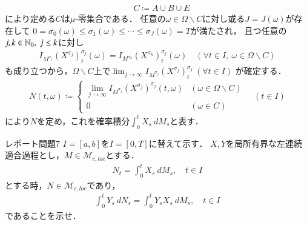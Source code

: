 \begin{prf}
\begin{description}
\begin{align}
					\quad C \coloneqq A \cup B \cup E
				\end{align}
				により定める$C$は$\mu$-零集合である．
				任意の$\omega \in \Omega \backslash C$に対し或る$J = J(\omega)$が存在して
				$0 = \sigma_0(\omega) \leq \sigma_1(\omega) \leq \cdots \leq \sigma_J(\omega) = T$が満たされ，
				且つ任意の$j,k \in \mathbb{N}_0,\ j \leq k$に対し
				\begin{align}
					I_{M^{\sigma_j}}(X^{\sigma_j})^{\sigma_j}_t(\omega) = I_{M^{\sigma_k}}(X^{\sigma_k})^{\sigma_j}_t(\omega)
					\quad (\forall t \in I,\ \omega \in \Omega \backslash C)
				\end{align}
				も成り立つから，$\Omega \backslash C$上で$\lim_{j \to \infty} I_{M^{\sigma_j}}(X^{\sigma_j})^{\sigma_j}_t\ (\forall t \in I)$
				が確定する．
				\begin{align}
					N(t,\omega) \coloneqq 
					\begin{cases}
						\lim\limits_{j \to \infty} I_{M^{\sigma_j}}(X^{\sigma_j})^{\sigma_j}(t,\omega) & (\omega \in \Omega \backslash C) \\
						0 & (\omega \in C)
					\end{cases}
					\quad (t \in I)
					\label{eq:Ito-Integral_on_M_c_loc_limit}
				\end{align}
				により$N$を定め，これを確率積分$\int_0^t X_s\ dM_s$と表す．
				\QED
		\end{description}
	\end{prf}
	
	\newpage
	\begin{itembox}[l]{レポート問題7}
		$I = [a,b]$を$I = [0,T]$に替えて示す．
		$X,Y$を局所有界な左連続適合過程とし，$M \in \mathcal{M}_{c,loc}$とする．
		\begin{align}
			N_t = \int_0^t X_s\ dM_s,
			\quad t \in I
		\end{align}
		とする時，$N \in \mathcal{M}_{c,loc}$であり，
		\begin{align}
			\int_0^t Y_s\ dN_s = \int_0^t Y_s X_s\ dM_s,
			\quad t \in I
			\label{eq:Ito-Integral_on_M_c_loc_report_7_0}
		\end{align}
		であることを示せ．
	\end{itembox}

